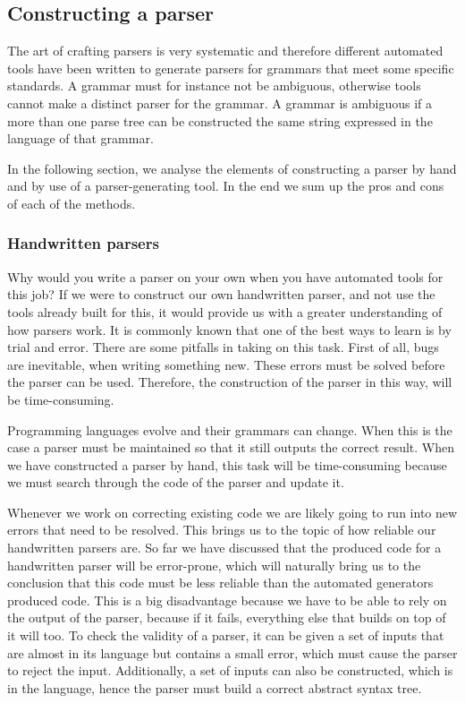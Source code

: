 \subsection{Constructing a parser}
\label{subsec:constructingaparser}
The art of crafting parsers is very systematic and therefore different
automated tools have been written to generate parsers for grammars
that meet some specific standards. A grammar must for instance not be
ambiguous, otherwise tools cannot make a distinct parser for the
grammar. A grammar is ambiguous if a more than one parse tree can be
constructed the same string expressed in the language of that grammar.

In the following section, we analyse the elements of constructing a parser by hand
and by use of a parser-generating tool. In the end we sum up the pros and cons
of each of the methods. 

\subsubsection{Handwritten parsers}
\label{subsec:handwrittenparsers}
Why would you write a parser on your own when you have automated tools
for this job? If we were to construct our own handwritten parser, and
not use the tools already built for this, it would provide us with a
greater understanding of how parsers work. It is commonly known that one
of the best ways to learn is by trial and error. There are some pitfalls
in taking on this task. First of all, bugs are inevitable, when writing
something new. These errors must be solved before the parser can be
used. Therefore, the construction of the parser in this way, will be
time-consuming.

Programming languages evolve and their grammars can change. When this is the
case a parser must be maintained so that it still outputs the correct result.
When we have constructed a parser by hand, this task will be time-consuming
because we must search through the code of the parser and update it.

Whenever we work on correcting existing code we are likely going to run
into new errors that need to be resolved. This brings us to the topic
of how reliable our handwritten parsers are. So far we have discussed
that the produced code for a handwritten parser will be error-prone,
which will naturally bring us to the conclusion that this code must be
less reliable than the automated generators produced code. This is a big
disadvantage because we have to be able to rely on the output of the
parser, because if it fails, everything else that builds on top of it
will too. To check the validity of a parser, it can be given a set of
inputs that are almost in its language but contains a small error, which
must cause the parser to reject the input. Additionally, a set of inputs
can also be constructed, which is in the language, hence the parser must
build a correct abstract syntax tree.

